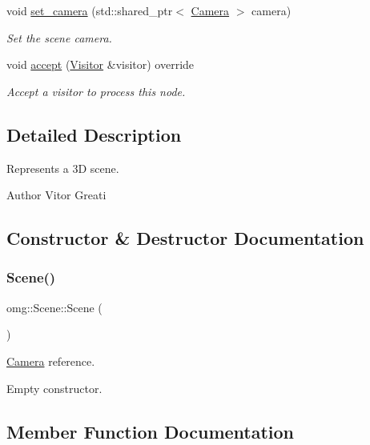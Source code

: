 \begin{DoxyCompactItemize}
void \mbox{\hyperlink{classomg_1_1_scene_a07875fddcc199bc2f70b1c20fd294af4}{set\+\_\+camera}} (std\+::shared\+\_\+ptr$<$ \mbox{\hyperlink{classomg_1_1_camera}{Camera}} $>$ camera)
\begin{DoxyCompactList}\small\item\em Set the scene camera. \end{DoxyCompactList}\item 
void \mbox{\hyperlink{classomg_1_1_scene_a460b3582d6dc72fcaeff4c08d44335d9}{accept}} (\mbox{\hyperlink{classomg_1_1_visitor}{Visitor}} \&visitor) override
\begin{DoxyCompactList}\small\item\em Accept a visitor to process this node. \end{DoxyCompactList}\end{DoxyCompactItemize}


\subsection{Detailed Description}
Represents a 3D scene. 

\begin{DoxyAuthor}{Author}
Vitor Greati 
\end{DoxyAuthor}


\subsection{Constructor \& Destructor Documentation}
\mbox{\label{classomg_1_1_scene_af5d02c499b861b1293e0d6232dabd2c8}} 
\subsubsection{\texorpdfstring{Scene()}{Scene()}}
{\footnotesize\ttfamily omg\+::\+Scene\+::\+Scene (\begin{DoxyParamCaption}{ }\end{DoxyParamCaption})\hspace{0.3cm}{\ttfamily [inline]}}



\mbox{\hyperlink{classomg_1_1_camera}{Camera}} reference. 

Empty constructor. 

\subsection{Member Function Documentation}
\mbox{\label{classomg_1_1_scene_a460b3582d6dc72fcaeff4c08d44335d9}} 
